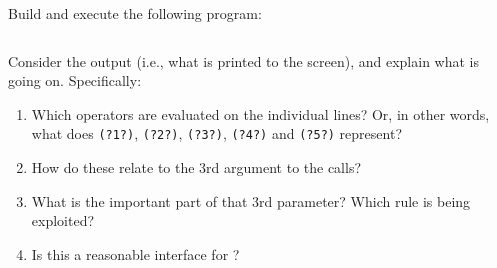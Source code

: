 Build and execute the following program:

\inputminted{csharp}{\context/question/OperatorTest.cs}

Consider the output (i.e., what is printed to the screen), and explain what is going on. Specifically:
\begin{enumerate}
  \item Which operators are evaluated on the individual lines? Or, in other words, what does \texttt{(?1?)}, \texttt{(?2?)}, \texttt{(?3?)}, \texttt{(?4?)} and \texttt{(?5?)} represent?
  \item How do these relate to the 3rd argument to the  calls?
  \item What is the important part of that 3rd parameter? Which rule is being exploited?
  \item Is this a reasonable interface for ?
\end{enumerate}

